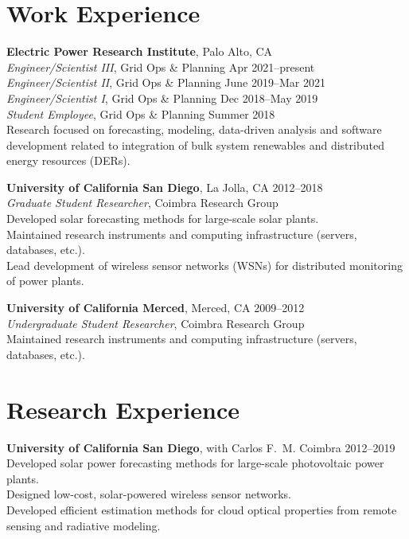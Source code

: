\documentclass[10pt]{res}
\begin{document}
\begin{resume}
\section{Work Experience}
\vspace{0.1in}

\textbf{Electric Power Research Institute}, Palo Alto, CA \\
\textit{Engineer/Scientist III}, Grid Ops \& Planning \hfill Apr 2021--present \\
\textit{Engineer/Scientist II}, Grid Ops \& Planning \hfill June 2019--Mar 2021 \\
\textit{Engineer/Scientist I}, Grid Ops \& Planning \hfill Dec 2018--May 2019 \\
\textit{Student Employee}, Grid Ops \& Planning \hfill Summer 2018 \\
Research focused on forecasting, modeling, data-driven analysis and software development related to integration of bulk system renewables and distributed energy resources (DERs).

\textbf{University of California San Diego}, La Jolla, CA \hfill 2012--2018 \\
\textit{Graduate Student Researcher}, Coimbra Research Group \\
Developed solar forecasting methods for large-scale solar plants. \\
Maintained research instruments and computing infrastructure (servers, databases, etc.). \\
Lead development of wireless sensor networks (WSNs) for distributed monitoring of power plants.

\textbf{University of California Merced}, Merced, CA \hfill 2009--2012 \\
\textit{Undergraduate Student Researcher}, Coimbra Research Group \\
Maintained research instruments and computing infrastructure (servers, databases, etc.).


\section{Research Experience}
\vspace{0.1in}

\textbf{University of California San Diego}, with Carlos F.~M. Coimbra \hfill 2012--2019 \\
Developed solar power forecasting methods for large-scale photovoltaic power plants. \\
Designed low-cost, solar-powered wireless sensor networks. \\
Developed efficient estimation methods for cloud optical properties from remote sensing and radiative modeling.


\end{resume}
\end{document}
